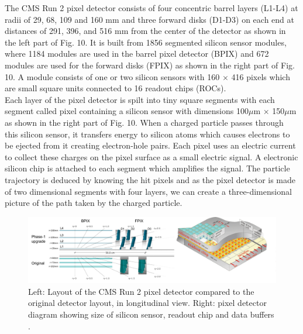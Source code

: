 The CMS Run 2 pixel detector consists of four concentric barrel layers (L1-L4) at radii of 29, 68, 109 and 160 mm and three forward disks (D1-D3) on each end at distances of 291, 396, and 516 mm from the center of the detector as shown in the left part of Fig. 10. It is built from 1856 segmented silicon sensor modules, where 1184 modules are used in the barrel pixel detector (BPIX) and 672 modules are used for the forward disks (FPIX) as shown in the right part of Fig. 10. A module consists of one or two silicon sensors with 160 $\times$ 416 pixels which are small square units connected to 16 readout chips (ROCs). \\

Each layer of the pixel detector is spilt into tiny square segments with each segment called pixel containing a silicon sensor with dimensions 100$\mu$m $\times$ 150$\mu$m as shown in the right part of Fig. 10. When a charged particle passes through this silicon sensor, it transfers energy to silicon atoms which causes electrons to be ejected from it creating electron-hole pairs. Each pixel uses an electric current to collect these charges on the pixel surface as a small electric signal. A electronic silicon chip is attached to each segment which amplifies the signal. The particle trajectory is deduced by knowing the hit pixels and as the pixel detector is made of two dimensional segments with four layers, we can create a three-dimensional picture of the path taken by the charged particle. \\


\begin{figure}[H]
  \centering
  \includegraphics[width=1 \columnwidth]{./pixeldetector_merged1.png}
  \caption{ \onehalfspacing Left: Layout of the CMS Run 2 pixel detector compared to the original detector layout, in longitudinal view. Right: pixel detector diagram showing size of silicon sensor, readout chip and data buffers \cite{TrackerGroupoftheCMS:2020bgg}.}
  \label{fig:LHC}
\end{figure}


